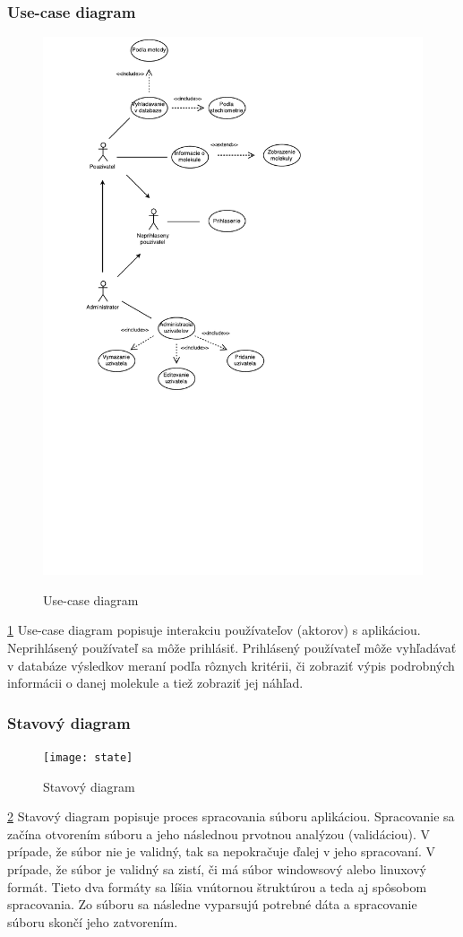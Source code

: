 \documentclass[12pt,a4paper]{article}
\begin{document}
\subsubsection{Use-case diagram}
\begin{figure}[H]
	\caption{Use-case diagram}
	\includegraphics[width=\textwidth]{use-case}
	\label{fig:use_case}
\end{figure}
\ref{fig:use_case}
Use-case diagram popisuje interakciu používateľov (aktorov) s aplikáciou. Neprihlásený používateľ sa môže prihlásiť. Prihlásený používateľ môže vyhľadávať v databáze výsledkov meraní podľa rôznych kritérii, či zobraziť výpis podrobných informácii o danej molekule a tiež zobraziť jej náhľad.

\subsubsection{Stavový diagram}
\begin{figure}[H]
	\caption{Stavový diagram}
	\texttt{[image: state]}
	\label{fig:state}
\end{figure}
\ref{fig:state}
Stavový diagram popisuje proces spracovania súboru aplikáciou. Spracovanie sa začína otvorením súboru a jeho následnou prvotnou analýzou (validáciou). V prípade, že súbor nie je validný, tak sa nepokračuje ďalej v jeho spracovaní. V prípade, že súbor je validný sa zistí, či má súbor windowsový alebo linuxový formát. Tieto dva formáty sa líšia vnútornou štruktúrou a teda aj spôsobom spracovania. Zo súboru sa následne vyparsujú potrebné dáta a spracovanie súboru skončí jeho zatvorením. 
\end{document}
